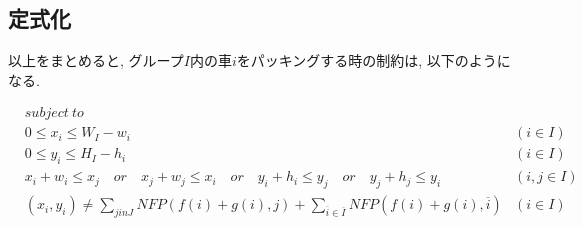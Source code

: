 \subsection{定式化}
以上をまとめると, グループ$I$内の車$i$をパッキングする時の制約は, 以下のようになる. 
\begin{center}  
\begin{align}
    & subject \ to \nonumber \\
    & 0 \leq x_i \leq W_I - w_i & (i \in I)\\
    & 0 \leq y_i \leq H_I - h_i & (i \in I)\\
    & x_i + w_i \leq x_j \hspace{1em}or \hspace{1em} x_j + w_j \leq x_i \hspace{1em}or \hspace{1em} y_i + h_i \leq y_j \hspace{1em}or \hspace{1em} y_j + h_j \leq y_i &(i,j \in I)\\
    & (x_i, y_i) \neq \sum_{j in J} NFP(f(i)+g(i),j) + \sum_{\overline{i} \in \overline{I}}NFP(f(i)+g(i),\overline{i}) & (i \in I)
\end{align}
\end{center}